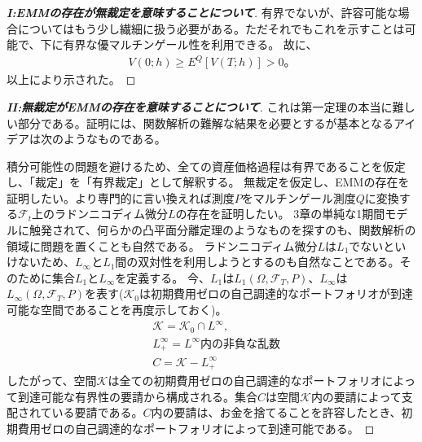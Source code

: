 \documentclass{jsbook}
\theoremstyle{withoutdotendstyle}
\numberwithin{theorem}{chapter}%
\begin{document}
\begin{proof}[{\bf I:EMMの存在が無裁定を意味することについて}]
  有界でないが、許容可能な場合についてはもう少し繊細に扱う必要がある。ただそれでもこれを示すことは可能で、下に有界な優マルチンゲール性を利用できる。
  故に、
  \begin{align}
    V\left(0;h\right)\geq E^{Q}\left[V\left(T;h\right)\right]>0\mbox{。}
  \end{align}
  以上により示された。
\end{proof}
\begin{proof}[{\bf II:無裁定がEMMの存在を意味することについて}]
  これは第一定理の本当に難しい部分である。証明には、関数解析の難解な結果を必要とするが基本となるアイデアは次のようなものである。

  積分可能性の問題を避けるため、全ての資産価格過程は有界であることを仮定し、「裁定」を「有界裁定」として解釈する。
  無裁定を仮定し、EMMの存在を証明したい。より専門的に言い換えれば測度$P$をマルチンゲール測度$Q$に変換する$\mathcal{F}_{t}$上のラドンニコディム微分$L$の存在を証明したい。
  3章の単純な1期間モデルに触発されて、何らかの凸平面分離定理のようなものを探すのも、関数解析の領域に問題を置くことも自然である。
  ラドンニコディム微分$L$は$L_{1}$でないといけないため、$L_{\infty}$と$L_{1}$間の双対性を利用しようとするのも自然なことである。そのために集合$L_{1}$と$L_{\infty}$を定義する。
  今、$L_{1}$は$L_{1}\left(\Omega, \mathcal{F}_{T}, P\right)$、$L_{\infty}$は$L_{\infty}\left(\Omega, \mathcal{F}_{T}, P\right)$を表す($\mathcal{K}_{0}$は初期費用ゼロの自己調達的なポートフォリオが到達可能な空間であることを再度示しておく)。
  \begin{align}
    &\mathcal{K} = \mathcal{K}_{0}\cap L^{\infty},\\
    &L^{\infty}_{+} = L^{\infty}\mbox{内の非負な乱数}\\
    &C=\mathcal{K} - L^{\infty}_{+}
  \end{align}
  したがって、空間$\mathcal{K}$は全ての初期費用ゼロの自己調達的なポートフォリオによって到達可能な有界性の要請から構成される。集合$C$は空間$\mathcal{K}$内の要請によって支配されている要請である。$C$内の要請は、お金を捨てることを許容したとき、初期費用ゼロの自己調達的なポートフォリオによって到達可能である。


\end{proof}
\end{document}
